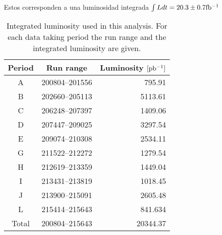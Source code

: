 Estos corresponden a una luminosidad integrada $\int L dt = 20.3 \pm 0.7 \mbox{fb$^{-1}$}$ \cite{lumi2012}

\begin{table}[ht]
  \centering
  \caption{Integrated luminosity used in this analysis. For each data taking period the run range and the integrated luminosity are given.}
  \begin{tabular}{c|c|r}
    \hline
    \hline
    Period & Run range & Luminosity $[\mbox{pb$^{-1}$}]$ \\
    \hline
    \hline
    A & 200804--201556 &  795.91 \\
    B & 202660--205113 &  5113.61 \\
    C & 206248--207397 &  1409.06 \\
    D & 207447--209025 &  3297.54 \\
    E & 209074--210308 &  2534.11 \\
    G & 211522--212272 &  1279.54 \\
    H & 212619--213359 &  1449.04 \\
    I  & 213431--213819 &  1018.45 \\
    J & 213900--215091 &  2605.48 \\
    L & 215414--215643 &  841.634 \\
    \hline
    \hline
    Total & 200804--215643 & 20344.37 \tabularnewline
    \hline
    \hline
  \end{tabular}
  \label{tab:data_periods}
\end{table}

